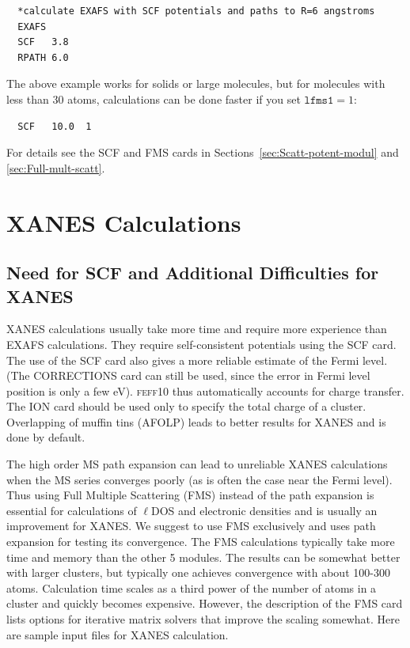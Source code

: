 \documentclass[11pt,oneside]{report} %
\renewcommand{\htmlref}[2]{\hyperlink{#2}{#1}}
\newcommand{\program}[1]{\textsc{#1}}
\newcommand{\feff}{\program{feff}}
\newcommand{\vnum}{10}
\newcommand{\feffcur}{\feff\vnum}
\renewcommand{\htmlref}[2]{{#1}} %
\begin{document}
\begin{verbatim}
  *calculate EXAFS with SCF potentials and paths to R=6 angstroms
  EXAFS
  SCF   3.8
  RPATH 6.0
\end{verbatim}

The above example works for solids or large molecules, but for molecules with 
less than 30 atoms, calculations can be done faster if you set $\mathtt{lfms1}=1$:
\begin{verbatim}
  SCF   10.0  1
\end{verbatim}

For details see the \htmlref{SCF}{card:scf} and \htmlref{FMS}{card:fms} cards in
Sections~\ref{sec:Scatt-potent-modul} and \ref{sec:Full-mult-scatt}.


\section{XANES Calculations}
\label{sec:XANES-calculations}

\subsection{Need for SCF and Additional Difficulties for XANES}
\label{sec:Addit-diff}
XANES calculations usually take more time and require more experience than EXAFS calculations.
They require self-consistent potentials using the \htmlref{SCF}{card:scf} card. The use of the SCF card 
also gives a more reliable estimate of the Fermi level.  (The CORRECTIONS card
can still be used, since the error in Fermi level position is only a few eV).
{\feffcur} thus automatically accounts for charge transfer. The ION card should 
be used only to specify the total charge of a cluster. Overlapping of muffin tins (AFOLP) leads to better results for XANES and is done by default.

The high order MS path expansion can lead to unreliable XANES calculations when the MS series converges
poorly (as is often the case near the Fermi level). Thus using Full Multiple Scattering (FMS) instead of the path expansion is essential for calculations of $\ell$DOS and
electronic densities and is usually an improvement for XANES. We suggest to use FMS exclusively and uses path expansion for testing its convergence.  The FMS calculations
typically take more time and memory than the other 5 modules. The
results can be somewhat better with larger clusters, but typically
one achieves convergence with about 100-300 atoms.  Calculation
time scales as a third power of the number of atoms in a cluster and
quickly becomes expensive.  However, the description of the FMS card lists options for iterative matrix solvers that improve
the scaling somewhat.
Here are sample input files for XANES calculation.
\end{document}
